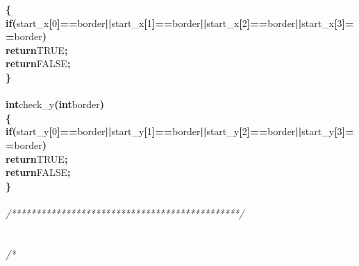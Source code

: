 \documentclass[a4paper, 10pt]{article}
\newcommand\SPC{\hspace*{0.6em}}
\newcommand\HYP{\mbox{\char 45}}
\newcommand{\CppAComment}[1]{\textit{\textcolor[rgb]{0.2,0.6,1}{#1}}}
\newcommand{\CppAIdentifier}[1]{#1}
\newcommand{\CppANumber}[1]{\textcolor[rgb]{0.5,0,0.5}{#1}}
\newcommand{\CppAReservedWord}[1]{\textbf{#1}}
\newcommand{\CppASpace}[1]{\colorbox[rgb]{1,1,1}{#1}}
\newcommand{\CppASymbol}[1]{\textbf{\textcolor[rgb]{1,0,0}{#1}}}
\begin{document}
\begin{ttfamily}
\CppASymbol{\{}\\
\CppASpace{\SPC }\CppAReservedWord{if}\CppASymbol{(}\CppAIdentifier{start\_x}\CppASymbol{[}\CppANumber{0}\CppASymbol{]}\CppASymbol{==}\CppAIdentifier{border}\CppASymbol{||}\CppAIdentifier{start\_x}\CppASymbol{[}\CppANumber{1}\CppASymbol{]}\CppASymbol{==}\CppAIdentifier{border}\CppASymbol{||}\CppAIdentifier{start\_x}\CppASymbol{[}\CppANumber{2}\CppASymbol{]}\CppASymbol{==}\CppAIdentifier{border}\CppASymbol{||}\CppAIdentifier{start\_x}\CppASymbol{[}\CppANumber{3}\CppASymbol{]}\CppASymbol{==}\CppAIdentifier{border}\CppASymbol{)}\\
\CppASpace{\SPC \SPC }\CppAReservedWord{return}\CppASpace{\SPC }\CppAIdentifier{TRUE}\CppASymbol{;}\\
\CppASpace{\SPC }\CppAReservedWord{return}\CppASpace{\SPC }\CppAIdentifier{FALSE}\CppASymbol{;}\\
\CppASymbol{\}}\\
\\
\CppAReservedWord{int}\CppASpace{\SPC }\CppAIdentifier{check\_y}\CppASymbol{(}\CppAReservedWord{int}\CppASpace{\SPC }\CppAIdentifier{border}\CppASymbol{)}\\
\CppASymbol{\{}\\
\CppASpace{\SPC }\CppAReservedWord{if}\CppASymbol{(}\CppAIdentifier{start\_y}\CppASymbol{[}\CppANumber{0}\CppASymbol{]}\CppASymbol{==}\CppAIdentifier{border}\CppASymbol{||}\CppAIdentifier{start\_y}\CppASymbol{[}\CppANumber{1}\CppASymbol{]}\CppASymbol{==}\CppAIdentifier{border}\CppASymbol{||}\CppAIdentifier{start\_y}\CppASymbol{[}\CppANumber{2}\CppASymbol{]}\CppASymbol{==}\CppAIdentifier{border}\CppASymbol{||}\CppAIdentifier{start\_y}\CppASymbol{[}\CppANumber{3}\CppASymbol{]}\CppASymbol{==}\CppAIdentifier{border}\CppASymbol{)}\\
\CppASpace{\SPC \SPC }\CppAReservedWord{return}\CppASpace{\SPC }\CppAIdentifier{TRUE}\CppASymbol{;}\\
\CppASpace{\SPC }\CppAReservedWord{return}\CppASpace{\SPC }\CppAIdentifier{FALSE}\CppASymbol{;}\\
\CppASymbol{\}}\\
\\
\CppAComment{/**********************************************/}\\
\\
\\
\CppAComment{/*\HYP \HYP \HYP \HYP \HYP \HYP \HYP \HYP \HYP \HYP \HYP \HYP \HYP \HYP \HYP \HYP \HYP \HYP \HYP \HYP \HYP \HYP \HYP \HYP \HYP \HYP \HYP \HYP \HYP \HYP \HYP \HYP \HYP \HYP \HYP \HYP \HYP \HYP \HYP \HYP \HYP \HYP \HYP \HYP \HYP \HYP \HYP \HYP \HYP \HYP \HYP \HYP \HYP \HYP \HYP \HYP \HYP \HYP \HYP \HYP \HYP \HYP \HYP \HYP \HYP \HYP \HYP \HYP \HYP \HYP \HYP \HYP \HYP \HYP \HYP \HYP \HYP \HYP \HYP }\\

\end{ttfamily}
\end{document}
